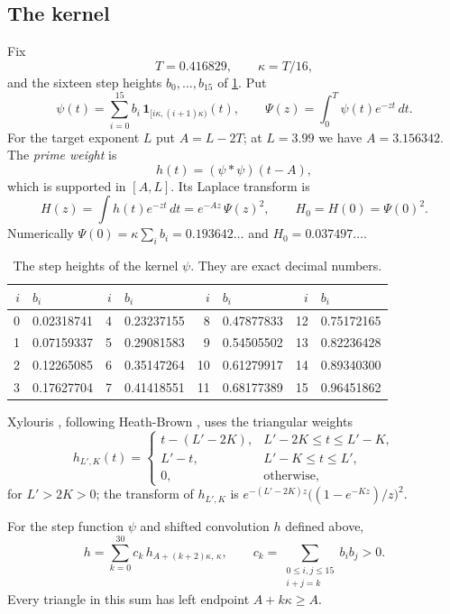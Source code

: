 \documentclass[11pt]{amsart}
\numberwithin{equation}{section}
\theoremstyle{plain}
\theoremstyle{definition}
\theoremstyle{remark}
\newcommand{\1}{\mathbf{1}}
\begin{document}
\subsection{The kernel}\label{subsec:kernel}
Fix
\[
  T=0.416829,\qquad \kappa=T/16,
\]
and the sixteen step heights $b_0,\dots,b_{15}$ of \cref{tab:beta}. Put
\[
  \psi(t)=\sum_{i=0}^{15}b_i\,\1_{[i\kappa,(i+1)\kappa)}(t),\qquad
  \Psi(z)=\int_0^T\psi(t)e^{-zt}\,dt .
\]
For the target exponent $L$ put $A=L-2T$; at $L=3.99$ we have $A=3.156342$. The \emph{prime
weight} is
\[
  h(t)=(\psi*\psi)(t-A),
\]
which is supported in $[A,L]$. Its Laplace transform is
\begin{equation}\label{eq:Hkernel}
  H(z)=\int h(t)e^{-zt}\,dt=e^{-Az}\,\Psi(z)^2,\qquad H_0=H(0)=\Psi(0)^2 .
\end{equation}
Numerically $\Psi(0)=\kappa\sum_ib_i=0.193642\ldots$ and $H_0=0.037497\ldots$.

\begin{table}[ht]
\centering
\small
\begin{tabular}{rl@{\qquad}rl@{\qquad}rl@{\qquad}rl}
\toprule
$i$ & $b_i$ & $i$ & $b_i$ & $i$ & $b_i$ & $i$ & $b_i$ \\
\midrule
0 & 0.02318741 & 4 & 0.23237155 & 8 & 0.47877833 & 12 & 0.75172165 \\
1 & 0.07159337 & 5 & 0.29081583 & 9 & 0.54505502 & 13 & 0.82236428 \\
2 & 0.12265085 & 6 & 0.35147264 & 10 & 0.61279917 & 14 & 0.89340300 \\
3 & 0.17627704 & 7 & 0.41418551 & 11 & 0.68177389 & 15 & 0.96451862 \\
\bottomrule
\end{tabular}
\caption{The step heights of the kernel $\psi$. They are exact decimal numbers.}
\label{tab:beta}
\end{table}

Xylouris \cite[(3.51)]{Xylouris2011nullstellen}, following Heath-Brown \cite[\S13]{HeathBrown1992zero},
uses the triangular weights
\[
  h_{L',K}(t)=\begin{cases}
    t-(L'-2K), & L'-2K\le t\le L'-K,\\
    L'-t, & L'-K\le t\le L',\\
    0, & \text{otherwise},
  \end{cases}
\]
for $L'>2K>0$; the transform of $h_{L',K}$ is $e^{-(L'-2K)z}\bigl((1-e^{-Kz})/z\bigr)^2$.

\begin{lemma}\label{lem:triangles}
For the step function $\psi$ and shifted convolution $h$ defined above,
\[
  h=\sum_{k=0}^{30}c_k\,h_{A+(k+2)\kappa,\,\kappa},\qquad
  c_k=\sum_{\substack{0\le i,j\le15\\ i+j=k}}b_ib_j>0 .
\]
Every triangle in this sum has left endpoint $A+k\kappa\ge A$.
\end{lemma}
\end{document}
